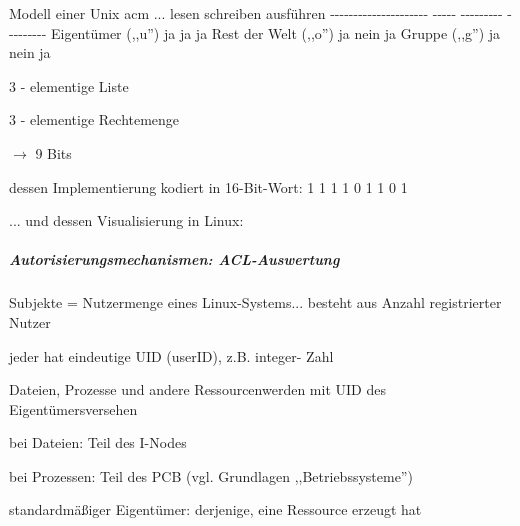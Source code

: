 \documentclass[a4paper]{article}
\begin{document}
\begin{multicols}{3}
    Modell einer Unix acm ... \textbar{} \textbar{} lesen \textbar{}
    schreiben \textbar{} ausführen \textbar{} \textbar{}
    -\/-\/-\/-\/-\/-\/-\/-\/-\/-\/-\/-\/-\/-\/-\/-\/-\/-\/-\/-\/- \textbar{}
    -\/-\/-\/-\/- \textbar{} -\/-\/-\/-\/-\/-\/-\/-\/- \textbar{}
    -\/-\/-\/-\/-\/-\/-\/-\/- \textbar{} \textbar{} Eigentümer (,,u'')
    \textbar{} ja \textbar{} ja \textbar{} ja \textbar{} \textbar{} Rest der
    Welt (,,o'') \textbar{} ja \textbar{} nein \textbar{} ja \textbar{}
    \textbar{} Gruppe (,,g'') \textbar{} ja \textbar{} nein \textbar{} ja
    \textbar{}

    \begin{itemize*}
        \item
        3 - elementige Liste
        \item
        3 - elementige Rechtemenge
        \item
        $\rightarrow$  9 Bits
        \item
        dessen Implementierung kodiert in 16-Bit-Wort: 1 1 1 1 0 1 1 0 1
        \item
        ... und dessen Visualisierung in Linux:
    \end{itemize*}



    \subparagraph{Autorisierungsmechanismen:
        ACL-Auswertung}

    Subjekte = Nutzermenge eines Linux-Systems... besteht aus Anzahl
    registrierter Nutzer

    \begin{itemize*}
        \item
        jeder hat eindeutige UID (userID), z.B. integer- Zahl
        \item
        Dateien, Prozesse und andere Ressourcenwerden mit UID des
        Eigentümersversehen
        \begin{itemize*}
            \item bei Dateien: Teil des I-Nodes
            \item bei Prozessen: Teil des PCB (vgl. Grundlagen ,,Betriebssysteme'')
            \item standardmäßiger Eigentümer: derjenige, eine Ressource erzeugt hat
        \end{itemize*}
    \end{itemize*}


\end{multicols}
\end{document}
